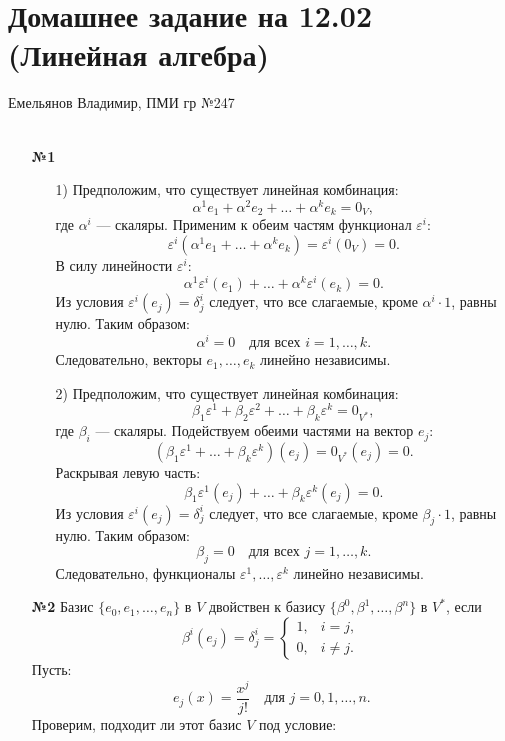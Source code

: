 \documentclass[a4paper]{article}
\begin{document}
\section*{Домашнее задание на 12.02 (Линейная алгебра)}
 {\large Емельянов Владимир, ПМИ гр №247}\\\\
\begin{enumerate}
    \item[\textbf{№1}]
    \begin{enumerate}
        \item[1)]
        Предположим, что существует линейная комбинация:
        \[
        \alpha^1 e_1 + \alpha^2 e_2 + \ldots + \alpha^k e_k = 0_V,
        \]
        где \( \alpha^i \) — скаляры. Применим к обеим частям функционал \( \varepsilon^i \):
        \[
        \varepsilon^i(\alpha^1 e_1 + \ldots + \alpha^k e_k) = \varepsilon^i(0_V) = 0.
        \]
        В силу линейности \( \varepsilon^i \):
        \[
        \alpha^1 \varepsilon^i(e_1) + \ldots + \alpha^k \varepsilon^i(e_k) = 0.
        \]
        Из условия \( \varepsilon^i(e_j) = \delta^i_j \) следует, что все слагаемые, кроме \( \alpha^i \cdot 1 \), равны нулю. Таким образом:
        \[
        \alpha^i = 0 \quad \text{для всех } i = 1, \ldots, k.
        \]
        Следовательно, векторы \( e_1, \ldots, e_k \) линейно независимы.

        \item[2)]
        Предположим, что существует линейная комбинация:
        \[
        \beta_1 \varepsilon^1 + \beta_2 \varepsilon^2 + \ldots + \beta_k \varepsilon^k = 0_{V^*},
        \]
        где \( \beta_i \) — скаляры. Подействуем обеими частями на вектор \( e_j \):
        \[
        (\beta_1 \varepsilon^1 + \ldots + \beta_k \varepsilon^k)(e_j) = 0_{V^*}(e_j) = 0.
        \]
        Раскрывая левую часть:
        \[
        \beta_1 \varepsilon^1(e_j) + \ldots + \beta_k \varepsilon^k(e_j) = 0.
        \]
        Из условия \( \varepsilon^i(e_j) = \delta^i_j \) следует, что все слагаемые, кроме \( \beta_j \cdot 1 \), равны нулю. Таким образом:
        \[
        \beta_j = 0 \quad \text{для всех } j = 1, \ldots, k.
        \]
        Следовательно, функционалы \( \varepsilon^1, \ldots, \varepsilon^k \) линейно независимы.\\
    \end{enumerate}

    \item[\textbf{№2}]Базис \( \{e_0, e_1, \ldots, e_n\} \) в \( V \) двойствен к базису \( \{\beta^0, \beta^1, \ldots, \beta^n\} \) в \( V^* \), если  
    \[
    \beta^i(e_j) = \delta^i_j = 
    \begin{cases} 
    1, & i = j, \\
    0, & i \neq j.
    \end{cases}
    \]
    Пусть:
    \[
    e_j(x) = \frac{x^j}{j!} \quad \text{для } j = 0, 1, \ldots, n.
    \]
    Проверим, подходит ли этот базис $V$ под условие:
    

\end{enumerate}
\end{document}
